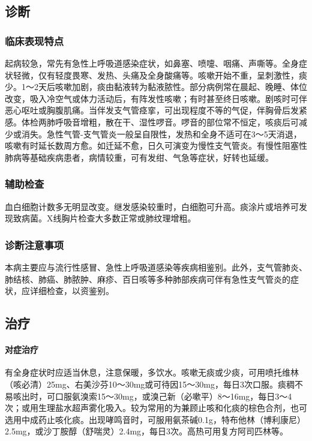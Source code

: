 \subsection{诊断}

\subsubsection{临床表现特点}

起病较急，常先有急性上呼吸道感染症状，如鼻塞、喷嚏、咽痛、声嘶等。全身症状轻微，仅有轻度畏寒、发热、头痛及全身酸痛等。咳嗽开始不重，呈刺激性，痰少。1～2天后咳嗽加剧，痰由黏液转为黏液脓性。部分病例常在晨起、晚睡、体位改变，吸入冷空气或体力活动后，有阵发性咳嗽；有时甚至终日咳嗽。剧咳时可伴恶心呕吐或胸腹肌痛。当伴发支气管痉挛，可出现程度不等的气促，伴胸骨后发紧感。体检两肺呼吸音增粗，散在干、湿性啰音。啰音的部位常不恒定，咳痰后可减少或消失。急性气管-支气管炎一般呈自限性，发热和全身不适可在3～5天消退，咳嗽有时延长数周方愈。如迁延不愈，日久可演变为慢性支气管炎。有慢性阻塞性肺病等基础疾病患者，病情较重，可有发绀、气急等症状，好转也延缓。

\subsubsection{辅助检查}

血白细胞计数多无明显改变。继发感染较重时，白细胞可升高。痰涂片或培养可发现致病菌。X线胸片检查大多数正常或肺纹理增粗。

\subsubsection{诊断注意事项}

本病主要应与流行性感冒、急性上呼吸道感染等疾病相鉴别。此外，支气管肺炎、肺结核、肺癌、肺脓肿、麻疹、百日咳等多种肺部疾病可伴有急性支气管炎的症状，应详细检查，以资鉴别。

\subsection{治疗}

\paragraph{对症治疗}

有全身症状时应适当休息，注意保暖，多饮水。咳嗽无痰或少痰，可用喷托维林（咳必清）25mg、右美沙芬10～30mg或可待因15～30mg，每日3次口服。痰稠不易咳出时，可口服氨溴索15～30mg，或溴己新（必嗽平）8～16mg，每日3～4次；或用生理盐水超声雾化吸入。较为常用的为兼顾止咳和化痰的棕色合剂，也可选用中成药止咳化痰。出现哮鸣音时，可服用氨茶碱0.1g，特布他林（博利康尼）2.5mg，或沙丁胺醇（舒喘灵）2.4mg，每日3次。高热可用复方阿司匹林等。

